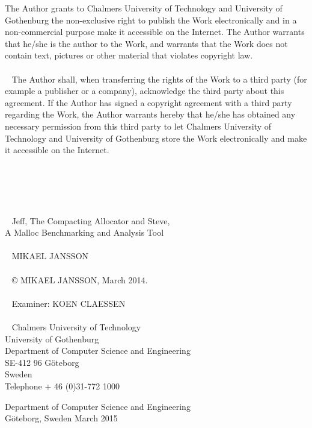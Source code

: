 \noindent
The Author grants to Chalmers University of Technology and University of Gothenburg  the non-exclusive right to publish the Work electronically and in a non-commercial purpose make it accessible on the Internet. 
The Author warrants that he/she is the author to the Work, and warrants that the Work does not contain text, pictures or other material that violates copyright law. \\
\\ ~
\noindent
The Author shall, when transferring the rights of the Work to a third party (for example a publisher or a company), acknowledge the third party about this agreement. If the Author has signed a copyright agreement with a third party regarding the Work, the Author warrants hereby that he/she has obtained any necessary permission from this third party to let Chalmers University of Technology and University of Gothenburg  store the Work electronically and make it accessible on the Internet. \\
\\ ~
\\ ~
\\ ~
\\ ~
\\ ~
\noindent
Jeff, The Compacting Allocator and Steve, \\
A Malloc Benchmarking and Analysis Tool \\
\\ ~
MIKAEL JANSSON \\
\\ ~
© MIKAEL JANSSON, March 2014. \\
\\ ~
Examiner: KOEN CLAESSEN \\
\\ ~
\noindent
Chalmers University of Technology \\
University of Gothenburg \\
Department of Computer Science and Engineering \\
SE-412 96 Göteborg \\
Sweden \\
Telephone + 46 (0)31-772 1000 \\


\newpage{}
\thispagestyle{empty}

\noindent
Department of Computer Science and Engineering \\
Göteborg, Sweden March 2015

\newpage{}
\thispagestyle{empty}


